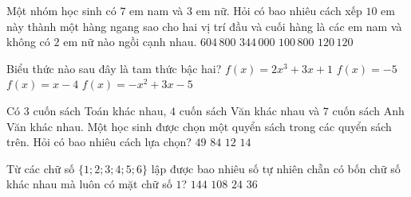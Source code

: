 \begin{ex}%
	Một nhóm học sinh có $7$ em nam và $3$ em nữ. Hỏi có bao nhiêu cách xếp $10$ em này thành một hàng ngang sao cho hai vị trí đầu và cuối hàng là các em nam và không có $2$ em nữ nào ngồi cạnh nhau.
	\choice
	{\True $604\,800$}
	{$344\,000$}
	{$100\,800$}
	{$120\,120$}
\end{ex}
\begin{ex}%
	Biểu thức nào sau đây là tam thức bậc hai?
	\choice
	{$f(x)=2x^3+3x+1$}
	{$f(x)=-5$}
	{$f(x)=x-4$}
	{\True $f(x)=-x^2+3x-5$}
\end{ex}
\begin{ex}%
	Có $3$ cuốn sách Toán khác nhau, $4$ cuốn sách Văn khác nhau và $7$ cuốn sách Anh Văn khác nhau. Một học sinh được chọn một quyển sách trong các quyển sách trên. Hỏi có bao nhiêu cách lựa chọn?
	\choice
	{$49$}
	{$84$}
	{$12$}
	{\True $14$}
\end{ex}
\begin{ex}%
	Từ các chữ số $\{1;2;3;4;5;6\}$ lập được bao nhiêu số tự nhiên chẵn có bốn chữ số khác nhau mà luôn có mặt chữ số $1$?
	\choice
	{$144$}
	{\True $108$}
	{$24$}
	{$36$}
\end{ex}
